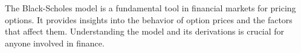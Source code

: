 \documentclass[../Main.tex]{subfiles}
\begin{document}
%
%

The Black-Scholes model is a fundamental tool in financial markets for pricing options. It provides insights into the behavior of option prices and the factors that affect them. Understanding the model and its derivations is crucial for anyone involved in finance.
\end{document}
